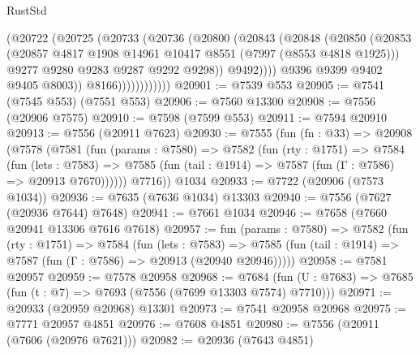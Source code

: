 \begin{lexlean}{RustStd}
\begin{coremodule}
{\begin{coremodule}
{{{{{{{{{{{{{{{{{{{{{{{{{{{{{{{{{{{{{{{{{{{                          (@20722
                            (@20725
                              (@20733
                                (@20736
                                  (@20800
                                    (@20843
                                      (@20848
                                        (@20850
                                          (@20853
                                            (@20857
                                              @4817
                                              @1908
                                              @14961
                                              @10417
                                              @8551
                                              (@7997 (@8553 @4818 @1925)))
                                            @9277
                                            @9280
                                            @9283
                                            @9287
                                            @9292
                                            @9298))
                                        @9492))))
                                @9396
                                @9399
                                @9402
                                @9405
                                @8003))
                            @8166))))))))))))
@20901 := @7539 @553
@20905 := @7541 (@7545 @553) (@7551 @553)
@20906 := @7560 @13300
@20908 := @7556 (@20906 @7575)
@20910 := @7598 (@7599 @553)
@20911 := @7594 @20910
@20913 := @7556 (@20911 @7623)
@20930 := @7555
    (fun (fn : @33) =>
    @20908
      (@7578
        (@7581
          (fun (params : @7580) =>
          @7582
            (fun (rty : @1751) =>
            @7584
              (fun (lets : @7583) =>
              @7585 (fun (tail : @1914) => @7587 (fun (Γ : @7586) => @20913 @7670))))))
        @7716))
    @1034
@20933 := @7722 (@20906 (@7573 @1034))
@20936 := @7635 (@7636 @1034) @13303
@20940 := @7556 (@7627 (@20936 @7644) @7648)
@20941 := @7661 @1034
@20946 := @7658 (@7660 @20941 @13306 @7616 @7618)
@20957 := fun (params : @7580) =>
  @7582
    (fun (rty : @1751) =>
    @7584
      (fun (lets : @7583) =>
      @7585 (fun (tail : @1914) => @7587 (fun (Γ : @7586) => @20913 (@20940 @20946)))))
@20958 := @7581 @20957
@20959 := @7578 @20958
@20968 := @7684
    (fun (U : @7683) => @7685 (fun (t : @7) => @7693 (@7556 (@7699 @13303 @7574) @7710)))
@20971 := @20933 (@20959 @20968) @13301
@20973 := @7541 @20958 @20968
@20975 := @7771 @20957 @4851
@20976 := @7608 @4851
@20980 := @7556 (@20911 (@7606 (@20976 @7621)))
@20982 := @20936 (@7643 @4851)
}}}}}}}}}}}}}}}}}}}}}}}}}}}}}}}}}}}}}}}}}}}
\end{coremodule}}
\end{coremodule}
\end{lexlean}
